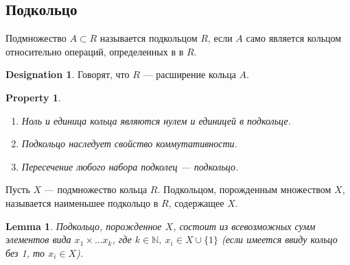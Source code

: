 \documentclass[11pt]{book}
\newcommand{\N}{\mathbb{N}}
\theoremstyle{definition}
\theoremstyle{plain}
\theoremstyle{plain}
\newtheorem{lm}{Lemma}
\newtheorem*{prop}{Property}
\theoremstyle{definition}
\newtheorem*{name}{Designation}
\theoremstyle{remark}
\begin{document}
\subsection{Подкольцо}
\begin{defn}
    Подмножество $ A \subset R$ называется {\sf подкольцом} $ R$, если  $ A$ само является  кольцом относительно операций, определенных в в $ R$.
    \begin{name}
	Говорят, что $ R$ --- расширение  кольца $ A$.
    \end{name}
\end{defn}
\begin{prop}
    $ $
    \begin{enumerate}[noitemsep]
	\item Ноль и единица кольца являются нулем и единицей в подкольце.
	\item Подкольцо наследует свойство коммутативности.
	\item Пересечение любого набора подколец --- подкольцо.
    \end{enumerate}
\end{prop}
\begin{defn}
    Пусть $ X$ --- подмножество кольца  $ R$. {\sf Подкольцом,  порожденным множеством}  $ X$, называется наименьшее подкольцо в  $ R$, содержащее $ X$.
\end{defn}
\begin{lm}
    Подкольцо, порожденное $ X$, состоит из всевозможных сумм элементов вида  $ x_1 \times  \ldots  x_k$, где $ k \in \N, ~ x_i \in X \cup \{1\}$ (если имеется ввиду кольцо без 1, то $ x_i \in X$).
\end{lm}
\end{document}
